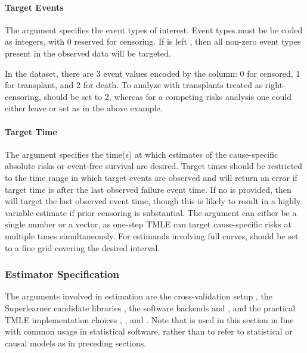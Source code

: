 \documentclass{report}
\newcommand{\1}{\ensuremath{\mathbf{1}}}
\begin{document}
\paragraph{Target Events}
\label{TargetEvent}
The  argument specifies the event types of interest. Event types must be be coded as integers, with 0 reserved for censoring. If  is left , then all non-zero event types present in the observed data will be targeted.

In the  dataset, there are 3 event values encoded by the  column: 0 for censored, 1 for transplant, and 2 for death. To analyze  with transplants treated as right-censoring,  should be set to 2,
whereas for a competing risks analysis one could either leave  or set  as in the above example.

\paragraph{Target Time}
\label{TargetTime}
The  argument specifies the time(s) at which estimates of the cause-specific absolute risks or event-free survival are desired. Target times should be restricted to the time range in which target events are observed and  will return an error if target time is after the last observed failure event time. If no  is provided, then  will target the last observed event time, though this is likely to result in a highly variable estimate if prior censoring is substantial. The  argument can either be a single number or a vector, as one-step TMLE can target cause-specific risks at multiple times simultaneously. For estimands involving full curves,  should be set to a fine grid covering the desired interval.

\subsubsection{Estimator Specification}
\label{EstimationSpec}
The  arguments involved in estimation are the cross-validation setup , the Superlearner candidate libraries , the software backends  and , and the practical TMLE implementation choices , , and . Note that  is used in this section in line with common usage in statistical software, rather than to refer to statistical or causal models as in preceding sections. 
\end{document}
